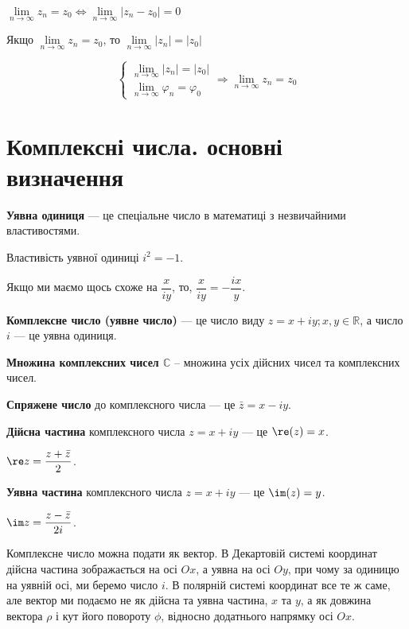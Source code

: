 \begin{claim}
$\lim\limits_{n\rightarrow\infty} z_n = z_0 \Leftrightarrow \lim\limits_{n\rightarrow\infty} |z_n-z_0| = 0$
\end{claim}

\begin{theorem}
Якщо $\lim\limits_{n\rightarrow\infty} z_n = z_0$, то $\lim\limits_{n\rightarrow\infty} |z_n| = |z_0|$
\end{theorem}

\begin{theorem}
$$ 
\left\{ \begin{array}{l}
\lim\limits_{n\rightarrow\infty} |z_n| = |z_0| \\
\lim\limits_{n\rightarrow\infty} \varphi_n = \varphi_0
\end{array}\right.
\Rightarrow \lim\limits_{n\rightarrow\infty} z_n = z_0
$$
\end{theorem}


\section{Комплексні числа. основні визначення}

\textbf{Уявна одиниця} --- це спеціальне число в математиці з незвичайними властивостями.

Властивість уявної одиниці $i^2 = -1$.

Якщо ми маємо щось схоже на $\dfrac{x}{iy}$, то, $\dfrac{x}{iy} = - \dfrac{ix}{y}$.

\textbf{Комплексне число (уявне число)} --- це число виду $z = x + iy; x, y \in \mathbb{R}$,
а число $i$ --- це уявна одиниця.

\textbf{Множина комплексних чисел $\mathbb{C}$} -- множина усіх дійсних чисел та комплексних чисел.

\textbf{Спряжене число} до комплексного числа --- це $\bar z = x - iy$.

\textbf{Дійсна частина} комплексного числа $z = x + iy$ --- це $\re(z) = x$.

$\re z = \dfrac{z + \bar{z}}{2}$.

\textbf{Уявна частина} комплексного числа $z = x + iy$ --- це $\im(z) = y$.

$\im z = \dfrac{z - \bar{z}}{2i}$.

Комплексне число можна подати як вектор.
В Декартовій системі координат дійсна частина зображається на осі $Ox$, а уявна на осі $Oy$, при чому за одиницю на уявній осі, ми беремо число $i$.
В полярній системі координат все те ж саме, але вектор ми подаємо не як дійсна  та уявна частина, $x$ та $y$, а як довжина вектора $\rho$ і кут його повороту $\phi$, відносно додатнього напрямку осі $Ox$.

